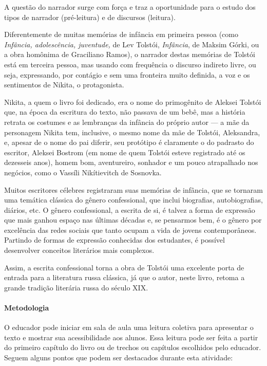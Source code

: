 \documentclass{article}
\begin{document}
A questão do narrador surge com força e traz a oportunidade para o
estudo dos tipos de narrador (pré-leitura) e de discursos (leitura).

Diferentemente de muitas memórias de infância em primeira pessoa (como
\emph{Infância, adolescência, juventude,} de Lev Tolstói,
\emph{Infância}, de Maksim Górki, ou a obra homônima de Graciliano
Ramos), o narrador destas memórias de Tolstói está em terceira pessoa,
mas usando com frequência o discurso indireto livre, ou seja,
expressando, por contágio e sem uma fronteira muito definida, a voz e os
sentimentos de Nikita, o protagonista.

Nikita, a quem o livro foi dedicado, era o nome do primogênito de
Aleksei Tolstói que, na época da escritura do texto, não passava de um
bebê, mas a história retrata os costumes e as lembranças da infância do
próprio autor --- a mãe da personagem Nikita tem, inclusive, o mesmo
nome da mãe de Tolstói, Aleksandra, e, apesar de o nome do pai diferir,
seu protótipo é claramente o do padrasto do escritor, Aleksei Bostrom
(em nome de quem Tolstói esteve registrado até os dezesseis anos), homem
bom, aventureiro, sonhador e um pouco atrapalhado nos negócios, como o
Vassíli Nikítievitch de Sosnovka.

Muitos escritores célebres registraram suas memórias de infância, que se
tornaram uma temática clássica do gênero confessional, que inclui
biografias, autobiografias, diários, etc. O gênero confessional, a
escrita de si, é talvez a forma de expressão que mais ganhou espaço nas
últimas décadas e, se pensarmos bem, é o gênero por excelência das redes
sociais que tanto ocupam a vida de jovens contemporâneos. Partindo de
formas de expressão conhecidas dos estudantes, é possível desenvolver
conceitos literários mais complexos.

Assim, a escrita confessional torna a obra de Tolstói uma excelente
porta de entrada para a literatura russa clássica, já que o autor, neste
livro, retoma a grande tradição literária russa do século XIX.

\paragraph{Metodologia}
O educador pode iniciar em sala de aula uma leitura coletiva para
apresentar o texto e mostrar sua acessibilidade aos alunos. Essa leitura
pode ser feita a partir do primeiro capítulo do livro ou de trechos ou
capítulos escolhidos pelo educador. Seguem alguns pontos que podem ser
destacados durante esta atividade:
\end{document}
